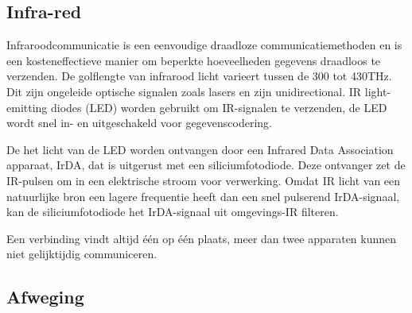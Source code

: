 \subsection{Infra-red}
Infraroodcommunicatie is een eenvoudige draadloze communicatiemethoden en is een kosteneffectieve manier om beperkte hoeveelheden gegevens draadloos te verzenden. De golflengte van infrarood licht varieert tussen de 300 tot 430THz. Dit zijn ongeleide optische signalen zoals lasers en zijn unidirectional. IR light-emitting diodes (LED) worden gebruikt om IR-signalen te verzenden, de LED wordt snel in- en uitgeschakeld voor gegevenscodering\cite{techopedia_ir}. 

De het licht van de LED worden ontvangen door een Infrared Data Association apparaat, IrDA, dat is uitgerust met een siliciumfotodiode. Deze ontvanger zet de IR-pulsen om in een elektrische stroom voor verwerking. Omdat IR licht van een natuurlijke bron een lagere frequentie heeft dan een snel pulserend IrDA-signaal, kan de siliciumfotodiode het IrDA-signaal uit omgevings-IR filteren.

Een verbinding vindt altijd één op één plaats, meer dan twee apparaten kunnen niet gelijktijdig communiceren.

\subsection{Afweging}
\begin{table}[H]
	\centering
	\caption{Wireless module afwegingstabel}
	\label{tab:wisb_afweging}
\end{table}

